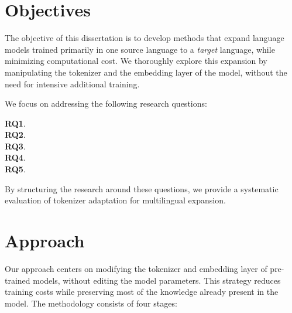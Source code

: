 \section{Objectives}\label{Section1.2}\label{sec:objectives}

The objective of this dissertation is to develop methods that expand language models trained primarily in one source language to a \textit{target} language, while minimizing computational cost. We thoroughly explore this expansion by manipulating the tokenizer and the embedding layer of the model, without the need for intensive additional training.

We focus on addressing the following research questions:

\textbf{RQ1}. \RQone\\
\textbf{RQ2}. \RQtwo\\
\textbf{RQ3}. \RQthree\\
\textbf{RQ4}. \RQfour\\
\textbf{RQ5}. \RQfive


By structuring the research around these questions, we provide a systematic evaluation of tokenizer adaptation for multilingual expansion.

\section{Approach}\label{Section1.3}
Our approach centers on modifying the tokenizer and embedding layer of pre-trained models, without editing the model parameters. This strategy reduces training costs while preserving most of the knowledge already present in the model. The methodology consists of four stages:


